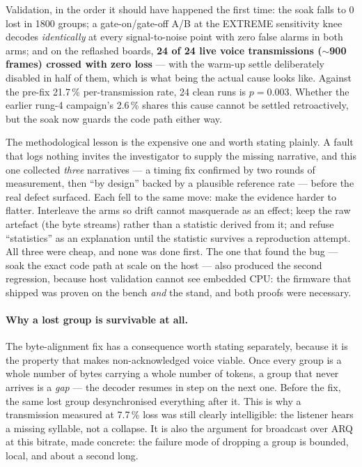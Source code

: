 Validation, in the order it should have happened the first time: the
soak falls to 0 lost in 1800 groups; a gate-on/gate-off A/B at the
EXTREME sensitivity knee decodes \emph{identically} at every
signal-to-noise point with zero false alarms in both arms; and on the
reflashed boards, \textbf{24 of 24 live voice transmissions
($\sim$900 frames) crossed with zero loss} --- with the warm-up settle
deliberately disabled in half of them, which is what being the actual
cause looks like.  Against the pre-fix 21.7\,\% per-transmission rate,
24 clean runs is $p = 0.003$.  Whether the earlier rung-4 campaign's
2.6\,\% shares this cause cannot be settled retroactively, but the
soak now guards the code path either way.

The methodological lesson is the expensive one and worth stating
plainly.  A fault that logs nothing invites the investigator to supply
the missing narrative, and this one collected \emph{three} narratives
--- a timing fix confirmed by two rounds of measurement, then ``by
design'' backed by a plausible reference rate --- before the real
defect surfaced.  Each fell to the same move: make the evidence harder
to flatter.  Interleave the arms so drift cannot masquerade as an
effect; keep the raw artefact (the byte streams) rather than a
statistic derived from it; and refuse ``statistics'' as an explanation
until the statistic survives a reproduction attempt.  All three were
cheap, and none was done first.  The one that found the bug --- soak
the exact code path at scale on the host --- also produced the second
regression, because host validation cannot see embedded CPU: the
firmware that shipped was proven on the bench \emph{and} the stand,
and both proofs were necessary.

\paragraph{Why a lost group is survivable at all.}
The byte-alignment fix has a consequence worth stating separately,
because it is the property that makes non-acknowledged voice viable.
Once every group is a whole number of bytes carrying a whole number of
tokens, a group that never arrives is a \emph{gap} --- the decoder
resumes in step on the next one.  Before the fix, the same lost group
desynchronised everything after it.  This is why a transmission
measured at 7.7\,\% loss was still clearly intelligible: the listener
hears a missing syllable, not a collapse.  It is also the argument for
broadcast over ARQ at this bitrate, made concrete: the failure mode of
dropping a group is bounded, local, and about a second long.

